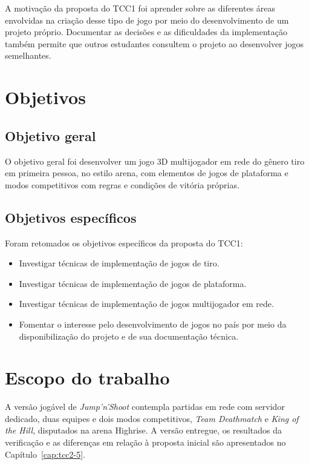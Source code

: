 A motivação da proposta do TCC1 foi aprender sobre as diferentes áreas envolvidas na criação desse tipo de jogo por meio do desenvolvimento de um projeto próprio. Documentar as decisões e as dificuldades da implementação também permite que outros estudantes consultem o projeto ao desenvolver jogos semelhantes.

\section{Objetivos}\label{sec:1.3}

\subsection{Objetivo geral}\label{sec:1.3.1}

O objetivo geral foi desenvolver um jogo 3D multijogador em rede do gênero tiro em primeira pessoa, no estilo arena, com elementos de jogos de plataforma e modos competitivos com regras e condições de vitória próprias.

\subsection{Objetivos específicos}\label{sec:1.3.2}

Foram retomados os objetivos específicos da proposta do TCC1:

\begin{itemize}
\item Investigar técnicas de implementação de jogos de tiro.
\item Investigar técnicas de implementação de jogos de plataforma.
\item Investigar técnicas de implementação de jogos multijogador em rede.
\item Fomentar o interesse pelo desenvolvimento de jogos no país por meio da disponibilização do projeto e de sua documentação técnica.
\end{itemize}

\section{Escopo do trabalho}\label{sec:1.4}

A versão jogável de \textit{Jump'n'Shoot} contempla partidas em rede com servidor dedicado, duas equipes e dois modos competitivos, \textit{Team Deathmatch} e \textit{King of the Hill}, disputados na arena Highrise. A versão entregue, os resultados da verificação e as diferenças em relação à proposta inicial são apresentados no Capítulo~\ref{cap:tcc2-5}.

